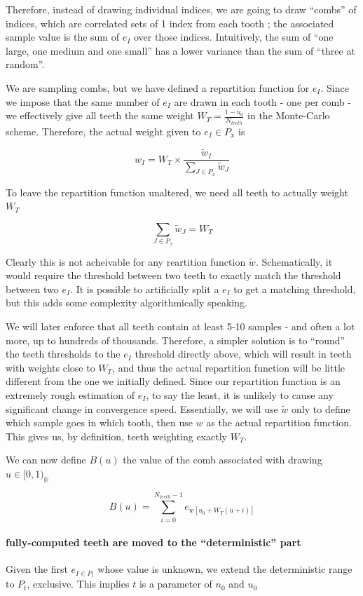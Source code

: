 \documentclass[./thesis.tex]{subfiles}
\begin{document}
Therefore, instead of drawing individual indices, we are going to draw ``combs'' of indices, which are correlated sets of 1 index from each tooth ; the associated sample value is the sum of $e_I$ over those indices. Intuitively, the sum of ``one large, one medium and one small'' has a lower variance than the sum of ``three at random''.

We are sampling combs, but we have defined a repartition function for $e_I$. Since we impose that the same number of $e_I$ are drawn in each tooth - one per comb - we effectively give all teeth the same weight $W_T=\frac{1-u_0}{N_{teeth}}$ in the Monte-Carlo scheme. Therefore, the actual weight given to $e_I \in P_x$ is

$$w_I = W_T \times \frac{\tilde w_I}{\sum_{J \in P_x} \tilde w_J}$$

To leave the repartition function unaltered, we need all teeth to actually weight $W_T$

$$\sum_{J \in P_x} \tilde w_J = W_T$$

Clearly this is not acheivable for any reartition function $\tilde w$. Schematically, it would require the threshold between two teeth to exactly match the threshold between two $e_I$. It is possible to artificially split a $e_I$ to get a matching threshold, but this adds some complexity algorithmically speaking.

We will later enforce that all teeth contain at least 5-10 samples - and often a lot more, up to hundreds of thousands. Therefore, a simpler solution is to ``round'' the teeth thresholds to the $e_I$ threshold directly above, which will result in teeth with weights close to $W_T$, and thus the actual repartition function will be little different from the one we initially defined. Since our repartition function is an extremely rough estimation of $e_I$, to say the least, it is unlikely to cause any significant change in convergence speed.
Essentially, we will use $\tilde w$ only to define which sample goes in which tooth, then use $w$ as the actual repartition function. This gives us, by definition, teeth weighting exactly $W_T$.

We can now define $B(u)$ the value of the comb associated with drawing $u \in [0,1)_\mathbb{R}$

\begin{equation}
B(u) = \sum_{i=0}^{N_{teeth}-1} e_{w[u_0+ W_T(u+i)]}
\end{equation}

\paragraph{fully-computed teeth are moved to the ``deterministic'' part}
Given the first $e_{I \in P_t}$ whose value is unknown, we extend the deterministic range to $P_t$, exclusive. This implies $t$ is a parameter of $n_0$ and $u_0$
\end{document}
